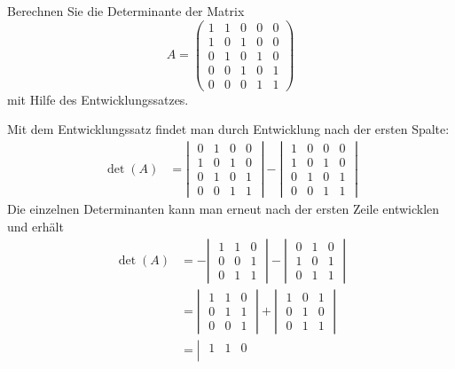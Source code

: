 Berechnen Sie die Determinante der Matrix
\[
A=
\begin{pmatrix}
1&1&0&0&0\\
1&0&1&0&0\\
0&1&0&1&0\\
0&0&1&0&1\\
0&0&0&1&1
\end{pmatrix}
\]
mit Hilfe des Entwicklungssatzes.


\begin{loesung}
Mit dem Entwicklungssatz findet man durch Entwicklung nach der
ersten Spalte:
\begin{align*}
\det(A)
&=
\left|\;
\begin{matrix}
0&1&0&0\\
1&0&1&0\\
0&1&0&1\\
0&0&1&1
\end{matrix}
\;\right|
-
\left|\;
\begin{matrix}
1&0&0&0\\
1&0&1&0\\
0&1&0&1\\
0&0&1&1
\end{matrix}
\;\right|
\end{align*}
Die einzelnen Determinanten kann man erneut nach der ersten Zeile
entwicklen und erhält
\begin{align*}
\det(A)
&=
-\left|\;
\begin{matrix}
1&1&0\\
0&0&1\\
0&1&1
\end{matrix}
\;\right|
-
\left|\;
\begin{matrix}
0&1&0\\
1&0&1\\
0&1&1
\end{matrix}
\;\right|
\\
&=
\left|\;
\begin{matrix}
1&1&0\\
0&1&1\\
0&0&1
\end{matrix}
\;\right|
+
\left|\;
\begin{matrix}
1&0&1\\
0&1&0\\
0&1&1
\end{matrix}
\;\right|
\\
&=
\left|\;
\begin{matrix}
1&1&0\\

\end{matrix}
\end{align*}
\end{loesung}
